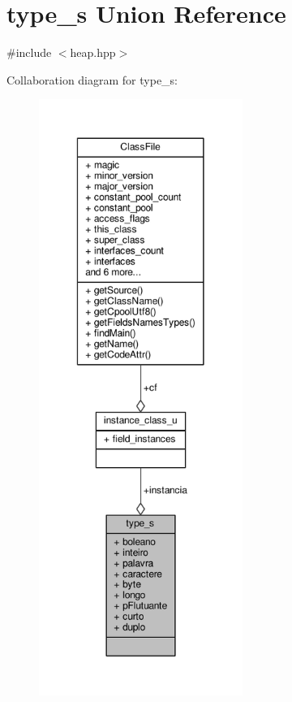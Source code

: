 \hypertarget{uniontype__s}{\section{type\+\_\+s Union Reference}
\label{uniontype__s}
}


{\ttfamily \#include $<$heap.\+hpp$>$}



Collaboration diagram for type\+\_\+s\+:\nopagebreak
\begin{figure}[H]
\begin{center}
\leavevmode
\includegraphics[height=550pt]{uniontype__s__coll__graph}
\end{center}
\end{figure}
